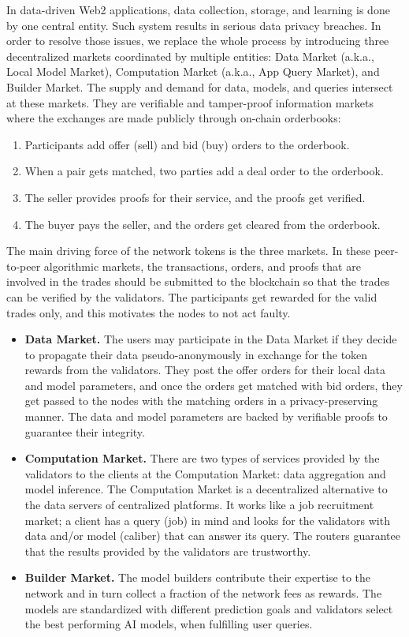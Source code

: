 \documentclass[11pt,letterpaper]{article}
\begin{document}
In data-driven Web2 applications, data collection, storage, and learning is done by one central entity. Such system results in serious data privacy breaches. In order to resolve those issues, we replace the whole process by introducing three decentralized markets coordinated by multiple entities: Data Market (a.k.a., Local Model Market), Computation Market (a.k.a., App Query Market), and Builder Market. The supply and demand for data, models, and queries intersect at these markets. They are verifiable and tamper-proof information markets where the exchanges are made publicly through on-chain orderbooks: 
\begin{enumerate}
    \item Participants add offer (sell) and bid (buy) orders to the orderbook.
    \item When a pair gets matched, two parties add a deal order to the orderbook.
    \item The seller provides proofs for their service, and the proofs get verified.
    \item The buyer pays the seller, and the orders get cleared from the orderbook.
\end{enumerate}

The main driving force of the network tokens is the three markets. In these peer-to-peer algorithmic markets, the transactions, orders, and proofs that are involved in the trades should be submitted to the blockchain so that the trades can be verified by the validators. The participants get rewarded for the valid trades only, and this motivates the nodes to not act faulty.

\begin{itemize}
\item \textbf{Data Market.}
The users may participate in the Data Market if they decide to propagate their data pseudo-anonymously in exchange for the token rewards from the validators. They post the offer orders for their local data and model parameters, and once the orders get matched with bid orders, they get passed to the nodes with the matching orders in a privacy-preserving manner. The data and model parameters are backed by verifiable proofs to guarantee their integrity.

\item \textbf{Computation Market.}
There are two types of services provided by the validators to the clients at the Computation Market: data aggregation and model inference. The Computation Market is a decentralized alternative to the data servers of centralized platforms. It works like a job recruitment market; a client has a query (job) in mind and looks for the validators with data and/or model (caliber) that can answer its query. The routers guarantee that the results provided by the validators are trustworthy.

\item \textbf{Builder Market.}
The model builders contribute their expertise to the network and in turn collect a fraction of the network fees as rewards. The models are standardized with different prediction goals and validators select the best performing AI models, when fulfilling user queries.
\end{itemize}
\end{document}
